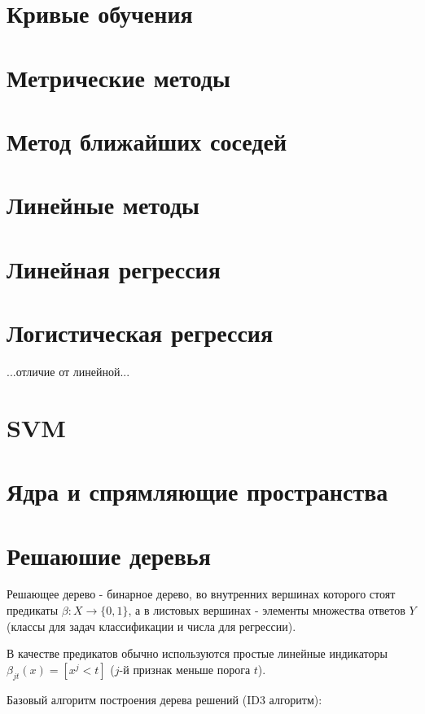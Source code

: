 \section{Кривые обучения}


\section{Метрические методы}


\section{Метод ближайших соседей}


\section{Линейные методы}


\section{Линейная регрессия}


\section{Логистическая регрессия}

...отличие от линейной...


\section{SVM}


\section{Ядра и спрямляющие пространства}


\section{Решаюшие деревья}

Решающее дерево - бинарное дерево, во внутренних вершинах которого стоят предикаты $\beta: X \rightarrow \{0, 1\}$, а в листовых вершинах - элементы множества ответов $Y$ (классы для задач классификации и числа для регрессии).

В качестве предикатов обычно используются простые линейные индикаторы $\beta_{jt}(x) = [x^j < t]$ ($j$-й признак меньше порога $t$).

Базовый алгоритм построения дерева решений (ID3 алгоритм):

